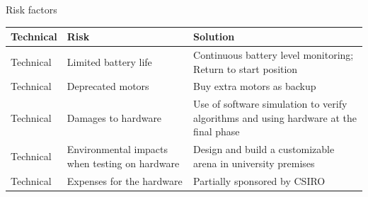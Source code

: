 \documentclass[xcolor=table]{beamer}
\begin{document}
\begin{frame}{Risk factors}
  \begin{footnotesize}
  \begin{center}
  \setlength{\arrayrulewidth}{0.2mm}
  \setlength{\tabcolsep}{5pt}
  \renewcommand{\arraystretch}{1.2}
 
  \begin{tabular}{ |p{2cm}|p{3.55cm}|p{5cm}| }
  \hline
  \textbf{Technical}&\textbf{Risk}&\textbf{Solution}\\
  \hline
  Technical&Limited battery life&Continuous battery level monitoring; Return to start position\\
  \hline
  Technical&Deprecated motors&Buy extra motors as backup\\
  \hline
  Technical&Damages to hardware&Use of software simulation to verify algorithms and using hardware at the final phase\\
  \hline
  Technical&Environmental impacts when testing on hardware&Design and build a customizable arena in university premises\\
  \hline
  Technical&Expenses for the hardware&Partially sponsored by CSIRO\\
  \hline
  \end{tabular}
  \end{center}
  \end{footnotesize}
\end{frame}
\end{document}
